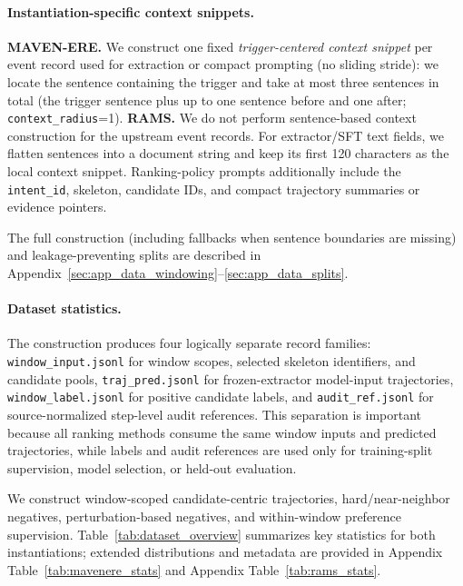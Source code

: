 \documentclass{article}
\begin{document}
\paragraph{Instantiation-specific context snippets.}
\textbf{MAVEN-ERE.} We construct one fixed \emph{trigger-centered context snippet} per event record used for extraction or compact prompting (no sliding stride): we locate the sentence containing the trigger and take at most three sentences in total (the trigger sentence plus up to one sentence before and one after; \texttt{context\_radius}=1).
\textbf{RAMS.} We do not perform sentence-based context construction for the upstream event records.
For extractor/SFT text fields, we flatten sentences into a document string and keep its first 120 characters as the local context snippet.
Ranking-policy prompts additionally include the \texttt{intent\_id}, skeleton, candidate IDs, and compact trajectory summaries or evidence pointers.

The full construction (including fallbacks when sentence boundaries are missing) and leakage-preventing splits are described in Appendix~\ref{sec:app_data_windowing}--\ref{sec:app_data_splits}.

\paragraph{Dataset statistics.}
The construction produces four logically separate record families:
\texttt{window\_input.jsonl} for window scopes, selected skeleton identifiers, and candidate pools,
\texttt{traj\_pred.jsonl} for frozen-extractor model-input trajectories,
\texttt{window\_label.jsonl} for positive candidate labels,
and \texttt{audit\_ref.jsonl} for source-normalized step-level audit references.
This separation is important because all ranking methods consume the same window inputs and predicted trajectories, while labels and audit references are used only for training-split supervision, model selection, or held-out evaluation.

We construct window-scoped candidate-centric trajectories, hard/near-neighbor negatives, perturbation-based negatives, and within-window preference supervision.
Table~\ref{tab:dataset_overview} summarizes key statistics for both instantiations; extended distributions and metadata are provided in Appendix Table~\ref{tab:mavenere_stats} and Appendix Table~\ref{tab:rams_stats}.
\end{document}
